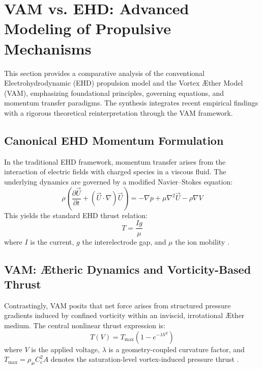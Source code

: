 
\section{VAM vs. EHD: Advanced Modeling of Propulsive Mechanisms}


This section provides a comparative analysis of the conventional Electrohydrodynamic (EHD) propulsion model and the Vortex Æther Model (VAM), emphasizing foundational principles, governing equations, and momentum transfer paradigms. The synthesis integrates recent empirical findings \cite{ehdreview2023} \cite{ehdpropeller2023} \cite{electricfluidsetup2023} \cite{ehdmodeling2023} with a rigorous theoretical reinterpretation through the VAM framework.


\subsection{Canonical EHD Momentum Formulation}
In the traditional EHD framework, momentum transfer arises from the interaction of electric fields with charged species in a viscous fluid. The underlying dynamics are governed by a modified Navier--Stokes equation:
\begin{equation}
\rho \left( \frac{\partial \vec{U}}{\partial t} + (\vec{U} \cdot \nabla)\vec{U} \right) = -\nabla p + \mu \nabla^2 \vec{U} - \rho \nabla V
\end{equation}
This yields the standard EHD thrust relation:
\begin{equation}
T = \frac{I g}{\mu}
\end{equation}
where $I$ is the current, $g$ the interelectrode gap, and $\mu$ the ion mobility \cite{ehdreview2023}.


\subsection{VAM: Ætheric Dynamics and Vorticity-Based Thrust}
Contrastingly, VAM posits that net force arises from structured pressure gradients induced by confined vorticity within an inviscid, irrotational Æther medium. The central nonlinear thrust expression is:
\begin{equation}
T(V) = T_\text{max}(1 - e^{-\lambda V^2})
\end{equation}
where $V$ is the applied voltage, $\lambda$ is a geometry-coupled curvature factor, and $T_\text{max} = \rho_\text{\ae} C_e^2 A$ denotes the saturation-level vortex-induced pressure thrust \cite{vamderive2024}.


